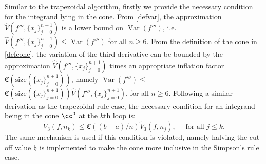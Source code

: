 \documentclass{iitthesis}
\DeclareMathOperator{\Var}{Var}
\theoremstyle{definition}
\theoremstyle{remark}
\begin{document}
Similar to the trapezoidal algorithm, firstly we provide the necessary condition for the integrand lying in the cone. From \eqref{defvar}, the approximation $\widehat{V}({f'''},\{x_j\}_{j=0}^{n+1})$ is a lower bound on $\Var({f'''})$, i.e. $\widehat{V}({f'''},\{x_j\}_{j=0}^{n+1})\leq \Var({f'''})$ for all $n \ge 6$. From the definition of the cone in \eqref{defcone}, the variation of the third derivative can be bounded by the approximation $\widehat{V}({f'''},\{x_j\}_{j=0}^{n+1})$ times an appropriate inflation factor $\mathfrak{C}(\text{size}(\{x_j\}_{j=0}^{n+1}))$, namely $\Var({f'''})\leq$$\mathfrak{C}(\text{size}(\{x_j\}_{j=0}^{n+1}))\widehat{V}({f'''},\{x_j\}_{j=0}^{n+1})$, for all $n \ge 6$. Following a similar derivation as the trapezoidal rule case, the necessary condition for an integrand being in the cone $\cc^3$ at the $k$th loop is:
\begin{equation}\label{necconsim}
    \widetilde{V}_3(f,n_k)\leq\mathfrak{C}((b-a)/n)\widetilde{V}_3(f,n_j), \quad \text{ for all } j \leq k.
\end{equation}
The same mechanism is used if this condition is violated, namely halving the cut-off value $\mathfrak{h}$ is implemented to make the cone more inclusive in the Simpson's rule case.
\end{document}
